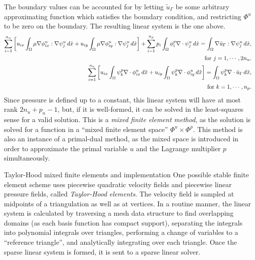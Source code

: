 \documentclass{article}
\begin{document}
The boundary values can be accounted for by letting $\tilde{u}_\Gamma$ be some arbitrary approximating function which satisfies the boundary condition,
and restricting $\Phi^u$ to be zero on the boundary. The resulting linear system is the one above.
\begin{equation}
\begin{split}
    \sum_{i=1}^{n_u}\left[
        u_{ix}\int_\Omega\mu\nabla\phi_{ix}^u:\nabla\psi_j^u\,d\hat{x}
        +
        u_{iy}\int_\Omega\mu\nabla\phi_{iy}^u:\nabla\psi_j^u\,d\hat{x}
    \right]
    +
    \sum_{i=1}^{n_p} p_i\int_\Omega \phi_i^p\nabla\cdot\psi^u_j\,d\hat{x}
    =
    \int_\Omega\nabla\tilde{u}_\Gamma:\nabla\psi_j^u\,d\hat{x},\\
    \text{\quad for $j=1,\cdots,2n_u$}.\\
    \sum_{i=1}^{n_u}\left[
        u_{ix}\int_\Omega\psi_k^p\nabla\cdot\phi_{ix}^u\,d\hat{x}
        +
        u_{iy}\int_\Omega\psi_k^p\nabla\cdot\phi_{iy}^u\,d\hat{x}
    \right]
    =
    \int_\Omega\psi_k^p\nabla\cdot\tilde{u}_\Gamma\,d\hat{x},\\
    \text{\quad for $k=1,\cdots,n_p$}.\\
\end{split}
\end{equation}
Since pressure is defined up to a constant, this linear system will have at most rank $2n_u + p_n - 1$,
but, if it is well-formed, it can be solved in the least-squares sense for a valid solution.
This is a \textit{mixed finite element method}, as the solution is solved for a function in a ``mixed finite element space'' $\Phi^u \times \Phi^p$.
This method is also an instance of a primal-dual method, as the mixed space is introduced in order to approximate the primal variable $u$
and the Lagrange multiplier $p$ simultaneously.


\newpage
\vskip 0.2in
{\large Taylor-Hood mixed finite elements and implementation}
\vskip 0.2in
One possible stable finite element scheme uses piecewise quadratic velocity fields
and piecewise linear pressure fields, called \textit{Taylor-Hood elements}.
The velocity field is sampled at midpoints of a triangulation as well as at vertices.
In a routine manner, the linear system is calculated by traversing a mesh data structure to find
overlapping domains (as each basis function has compact support), separating the integrals into polynomial integrals over triangles,
performing a change of variables to a ``reference triangle'', and analytically integrating over each triangle.
Once the sparse linear system is formed, it is sent to a sparse linear solver.
\end{document}
